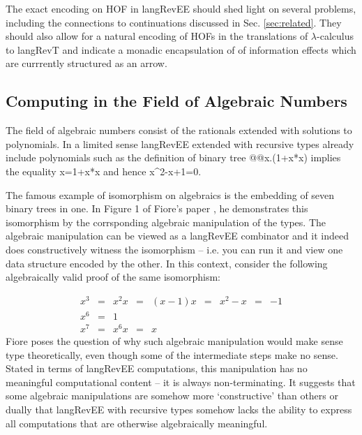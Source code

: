 \documentclass[preprint]{sigplanconf}
\newcommand{\lcal}{\ensuremath{\lambda}-calculus\xspace}
\begin{document}
The exact encoding on HOF in {{langRevEE}} should shed light on
several problems, including the connections to continuations discussed
in Sec. \ref{sec:related}. They should also allow for a natural
encoding of HOFs in the translations of \lcal to {{langRevT}} and
indicate a monadic encapsulation of of information effects which are
currrently structured as an arrow.


\subsection{Computing in the Field of Algebraic Numbers}

The field of algebraic numbers consist of the rationals extended with
solutions to polynomials. In a limited sense {{langRevEE}} extended
with recursive types already include polynomials such as the
definition of binary tree {{@@x.(1+x*x)}} implies the equality
{{x=1+x*x}} and hence {{x^2-x+1=0}}. 



The famous example of isomorphism on algebraics is the embedding of
seven binary trees in one. In Figure 1 of Fiore's paper
\cite{Fiore:2004}, he demonstrates this isomorphism by the
corrsponding algebraic manipulation of the types.  The algebraic
manipulation can be viewed as a {{langRevEE}} combinator and it indeed
does constructively witness the isomorphism -- i.e. you can run it and
view one data structure encoded by the other. In this context,
consider the following algebraically valid proof of the same
isomorphism:

\[\begin{array}{rclclclcl}
x^3 &=& x^2 x &=& (x-1) x &=& x^2 - x &=& -1 \\
x^6 &=& 1 \\
x^7 &=& x^6 x &=& x
\end{array}\]
Fiore poses the question of why such algebraic manipulation would make
sense type theoretically, even though some of the intermediate steps
make no sense.  Stated in terms of {{langRevEE}} computations, this
manipulation has no meaningful computational content -- it is always
non-terminating. It suggests that some algebraic manipulations are
somehow more `constructive' than others or dually that {{langRevEE}}
with recursive types somehow lacks the ability to express all
computations that are otherwise algebraically meaningful.
\end{document}
